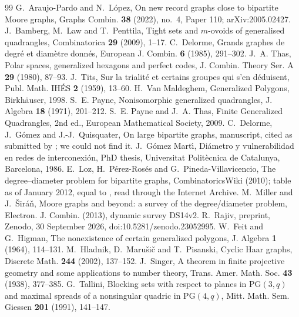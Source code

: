 \documentclass[11pt]{amsart}
\theoremstyle{definition}
\theoremstyle{remark}
\begin{document}
\clearpage
\begin{thebibliography}{99}
 G.~Araujo-Pardo and N.~L\'opez, On new record graphs close to bipartite Moore graphs, Graphs Combin. \textbf{38} (2022), no.~4, Paper 110; arXiv:2005.02427.
 J.~Bamberg, M.~Law and T.~Penttila, Tight sets and $m$-ovoids of generalised quadrangles, Combinatorica \textbf{29} (2009), 1--17.
 C.~Delorme, Grands graphes de degr\'e et diam\`etre donn\'es, European J. Combin. \textbf{6} (1985), 291--302.
 J.~A. Thas, Polar spaces, generalized hexagons and perfect codes, J. Combin. Theory Ser. A \textbf{29} (1980), 87--93.
 J.~Tits, Sur la trialit\'e et certains groupes qui s'en d\'eduisent, Publ. Math. IH\'ES \textbf{2} (1959), 13--60.
 H.~Van Maldeghem, Generalized Polygons, Birkh\"auser, 1998.
 S.~E. Payne, Nonisomorphic generalized quadrangles, J. Algebra \textbf{18} (1971), 201--212.
 S.~E. Payne and J.~A. Thas, Finite Generalized Quadrangles, 2nd ed., European Mathematical Society, 2009.
 C.~Delorme, J.~G\'omez and J.-J.~Quisquater, On large bipartite graphs, manuscript, cited as submitted by \cite{LPP}; we could not find it.
 J.~G\'omez Mart\'{\i}, Di\'ametro y vulnerabilidad en redes de interconexi\'on, PhD thesis, Universitat Polit\`ecnica de Catalunya, Barcelona, 1986.
 E.~Loz, H.~P\'erez-Ros\'es and G.~Pineda-Villavicencio, The degree--diameter problem for bipartite graphs, CombinatoricsWiki (2010); table as of January 2012, equal to \cite[Table 4]{MS13}, read through the Internet Archive.
 M.~Miller and J.~\v{S}ir\'a\v{n}, Moore graphs and beyond: a survey of the degree/diameter problem, Electron. J. Combin. (2013), dynamic survey DS14v2.
 R.~Rajiv, preprint, Zenodo, 30 September 2026, doi:10.5281/zenodo.23052995.
 W.~Feit and G.~Higman, The nonexistence of certain generalized polygons, J. Algebra \textbf{1} (1964), 114--131.
 M.~Hladnik, D.~Maru\v{s}i\v{c} and T.~Pisanski, Cyclic Haar graphs, Discrete Math. \textbf{244} (2002), 137--152.
 J.~Singer, A theorem in finite projective geometry and some applications to number theory, Trans. Amer. Math. Soc. \textbf{43} (1938), 377--385.
 G.~Tallini, Blocking sets with respect to planes in $\mathrm{PG}(3,q)$ and maximal spreads of a nonsingular quadric in $\mathrm{PG}(4,q)$, Mitt. Math. Sem. Giessen \textbf{201} (1991), 141--147.
\end{thebibliography}
\end{document}
